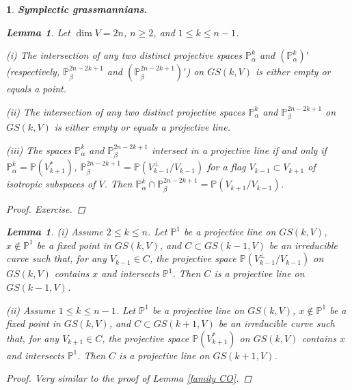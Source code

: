 \documentclass[12pt]{amsart}
\newtheorem{lemma}[theorem]{Lemma}
\newtheorem{sub}[subsection]{}
\theoremstyle{definition}
\begin{document}
\begin{sub}{\bf Symplectic grassmannians.}
\begin{lemma}\label{intersect dim=1}
Let $\dim V=2n$, $n\ge2$, and $1\le k\le n-1$.

(i) The intersection of any two distinct projective spaces $\mathbb{P}^k_{\alpha}$ and
$(\mathbb{P}^k_{\alpha})'$ (respectively, $\mathbb{P}^{2n-2k+1}_{\beta}$ and $(\mathbb{P}^{2n-2k+1}_{\beta})'$) on
$GS(k,V)$ is either empty or equals a point.

(ii) The intersection of any two distinct projective spaces $\mathbb{P}^k_{\alpha}$ and
$\mathbb{P}^{2n-2k+1}_{\beta}$ on $GS(k,V)$ is either empty or equals a projective line.

\vspace{3mm}
(iii) The spaces $\mathbb{P}^k_{\alpha}$ and $\mathbb{P}^{2n-2k+1}_{\beta}$ intersect in a projective line
if and only if
$\mathbb{P}^k_{\alpha}=\mathbb{P}(V_{k+1}^*)$, $\mathbb{P}^{2n-2k+1}_{\beta}=\mathbb{P}(V_{k-1}^\bot/V_{k-1})$ for a
flag $V_{k-1}\subset V_{k+1}$ of isotropic subspaces of $V$. Then
$\mathbb{P}^k_{\alpha}\cap\mathbb{P}^{2n-2k+1}_{\beta}=\mathbb{P}(V_{k+1}/V_{k-1})$.
\end{lemma}
\begin{proof} Exercise.
\end{proof}

\begin{lemma}\label{family CS}
(i) Assume $2\le k\le n$.
Let $\mathbb{P}^1$ be a projective
line on $GS(k,V)$, $x\not\in\mathbb{P}^1$ be a fixed point in $GS(k,V)$, and $C\subset GS(k-1,V)$ be
an irreducible curve such that, for any $V_{k-1}\in C$, the projective space $\mathbb{P}(V_{k-1}^\bot/V_{k-1})$ on
$GS(k,V)$ contains $x$ and intersects $\mathbb{P}^1$. Then $C$ is a projective line on $GS(k-1,V)$.

(ii) Assume $1\le k\le n-1$. Let $\mathbb{P}^1$ be a projective
line on $GS(k,V)$, $x\not\in\mathbb{P}^1$ be a fixed point in $GS(k,V)$, and $C\subset GS(k+1,V)$ be an
irreducible curve such that, for any $V_{k+1}\in C$, the projective space $\mathbb{P}(V_{k+1}^*)$ on $GS(k,V)$ contains
$x$ and intersects $\mathbb{P}^1$. Then $C$ is a projective line on $GS(k+1,V)$.


\end{lemma}
\begin{proof}
Very similar to the proof of Lemma \ref{family CO}.
\end{proof}

\vspace{3mm}




\end{sub}
\end{document}
